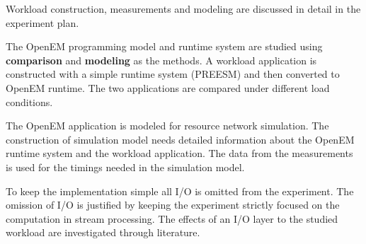 Workload construction, measurements and modeling are discussed in detail in the experiment plan.

The OpenEM programming model and runtime system are studied using \textbf{comparison} and \textbf{modeling} as the methods. A workload application is constructed with a simple runtime system (PREESM) and then converted to OpenEM runtime. The two applications are compared under different load conditions.

The OpenEM application is modeled for resource network simulation. The construction of simulation model needs detailed information about the OpenEM runtime system and the workload application. The data from the measurements is used for the timings needed in the simulation model.

To keep the implementation simple all I/O is omitted from the experiment. The omission of I/O is justified by keeping the experiment strictly focused on the computation in stream processing. The effects of an I/O layer to the studied workload are investigated through literature. 